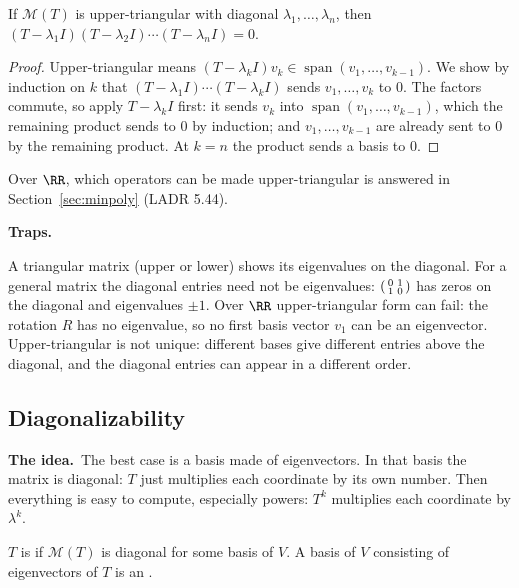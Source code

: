 \documentclass[10pt]{scrartcl}
\DeclareMathOperator{\spn}{span}
\newcommand{\MM}{\mathcal M}
\newcommand{\traps}{\par\medskip\noindent\textbf{\color{RawSienna}Traps.}\ }
\newcommand{\idea}{\par\noindent\textbf{\color{MidnightBlue}The idea.}\ }
\begin{document}
\begin{proposition*}[LADR 5.40]
  If $\MM(T)$ is upper-triangular with diagonal $\lambda_1,\dots,\lambda_n$, then $(T-\lambda_1I)(T-\lambda_2I)\cdots(T-\lambda_nI)=0$.
\end{proposition*}
\begin{proof}
  Upper-triangular means $(T-\lambda_kI)v_k\in\spn(v_1,\dots,v_{k-1})$. We show by induction on $k$ that $(T-\lambda_1I)\cdots(T-\lambda_kI)$ sends $v_1,\dots,v_k$ to $0$. The factors commute, so apply $T-\lambda_kI$ first: it sends $v_k$ into $\spn(v_1,\dots,v_{k-1})$, which the remaining product sends to $0$ by induction; and $v_1,\dots,v_{k-1}$ are already sent to $0$ by the remaining product. At $k=n$ the product sends a basis to $0$.
\end{proof}
Over $\RR$, which operators can be made upper-triangular is answered in Section~\ref{sec:minpoly} (LADR 5.44).

\traps
\begin{itemize}
  \ii A triangular matrix (upper or lower) shows its eigenvalues on the diagonal. For a general matrix the diagonal entries need not be eigenvalues: $\begin{psmallmatrix}0&1\\1&0\end{psmallmatrix}$ has zeros on the diagonal and eigenvalues $\pm1$.
  \ii Over $\RR$ upper-triangular form can fail: the rotation $R$ has no eigenvalue, so no first basis vector $v_1$ can be an eigenvector.
  \ii Upper-triangular is not unique: different bases give different entries above the diagonal, and the diagonal entries can appear in a different order.
\end{itemize}

\subsection{Diagonalizability}\label{sec:diag}
\idea The best case is a basis made of eigenvectors. In that basis the matrix is diagonal: $T$ just multiplies each coordinate by its own number. Then everything is easy to compute, especially powers: $T^k$ multiplies each coordinate by $\lambda^k$.

\begin{definition*}
  $T$ is  if $\MM(T)$ is diagonal for some basis of $V$. A basis of $V$ consisting of eigenvectors of $T$ is an .
\end{definition*}
\end{document}
